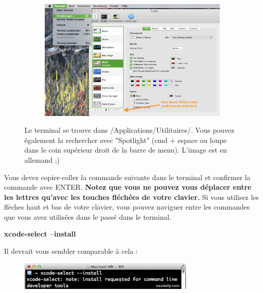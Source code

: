 \documentclass{article}
\begin{document}
\begin{figure}[H]
\begin{subfigure}[c]{0.6\textwidth}
\includegraphics[width=1.\textwidth]{Plots/Terminal3.png}
\end{subfigure}
\caption{Le terminal se trouve dans /Applications/Utilitaires/. Vous pouvez également la rechercher avec "Spotlight" (cmd + espace ou loupe dans le coin supérieur droit de la barre de menu). L'image est en allemand ;) \label{F:HowToFindTerminal}}
\end{figure}



Vous devez copier-coller la commande suivante dans le terminal et confirmer la commande avec ENTER. \textbf{Notez que vous ne pouvez vous déplacer entre les lettres qu'avec les touches fléchées de votre clavier. } Si vous utilisez les flèches haut et bas de votre clavier, vous pouvez naviguer entre les commandes que vous avez utilisées dans le passé dans le terminal.
\begin{tcolorbox}[width=\textwidth,colframe=Bittersweet,colback={black},title={Ceci est le terminal},outer arc=0mm,colupper=white]    
      \large\textbf{xcode-select --install}
\end{tcolorbox}
Il devrait vous sembler comparable à cela :
\begin{figure}[H]
\center
\includegraphics[width=0.75\textwidth]{Plots/install-command-line-tools-os-x.jpg}
\end{figure}
\end{document}
